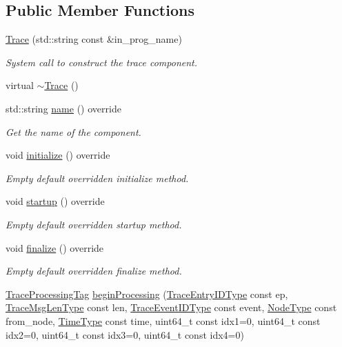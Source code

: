 \subsection*{Public Member Functions}
\begin{DoxyCompactItemize}
\item 
\hyperlink{structvt_1_1trace_1_1_trace_a2b736f560ee446cbd84aaf96e25c8d0b}{Trace} (std\+::string const \&in\+\_\+prog\+\_\+name)
\begin{DoxyCompactList}\small\item\em System call to construct the trace component. \end{DoxyCompactList}\item 
virtual \hyperlink{structvt_1_1trace_1_1_trace_a80b3426aed07572525ef4834b0c4dedd}{$\sim$\+Trace} ()
\item 
std\+::string \hyperlink{structvt_1_1trace_1_1_trace_aaae4bbf6d009229a5c8b9db67a127942}{name} () override
\begin{DoxyCompactList}\small\item\em Get the name of the component. \end{DoxyCompactList}\item 
void \hyperlink{structvt_1_1trace_1_1_trace_a24019edd964c0a307008f8d6a0f1f825}{initialize} () override
\begin{DoxyCompactList}\small\item\em Empty default overridden initialize method. \end{DoxyCompactList}\item 
void \hyperlink{structvt_1_1trace_1_1_trace_a5dd8767d9020ebeaba49ea3a684738a1}{startup} () override
\begin{DoxyCompactList}\small\item\em Empty default overridden startup method. \end{DoxyCompactList}\item 
void \hyperlink{structvt_1_1trace_1_1_trace_a571333fa708843b1b24079eccfc3ba93}{finalize} () override
\begin{DoxyCompactList}\small\item\em Empty default overridden finalize method. \end{DoxyCompactList}\item 
\hyperlink{structvt_1_1trace_1_1_trace_processing_tag}{Trace\+Processing\+Tag} \hyperlink{structvt_1_1trace_1_1_trace_ad483e7ced77aedcfd047e3d892e0191f}{begin\+Processing} (\hyperlink{namespacevt_1_1trace_a3c14050715ba9eceaeff51fb3de64f2f}{Trace\+Entry\+I\+D\+Type} const ep, \hyperlink{namespacevt_1_1trace_aeb598f45d67d41db7902e494f2f0ce59}{Trace\+Msg\+Len\+Type} const len, \hyperlink{namespacevt_1_1trace_a64a7185f3e102df8d8258f263ccd1582}{Trace\+Event\+I\+D\+Type} const event, \hyperlink{namespacevt_a866da9d0efc19c0a1ce79e9e492f47e2}{Node\+Type} const from\+\_\+node, \hyperlink{namespacevt_a2b9f28078dc309ad0706b69ded743e69}{Time\+Type} const time, uint64\+\_\+t const idx1=0, uint64\+\_\+t const idx2=0, uint64\+\_\+t const idx3=0, uint64\+\_\+t const idx4=0)

\end{DoxyCompactItemize}
